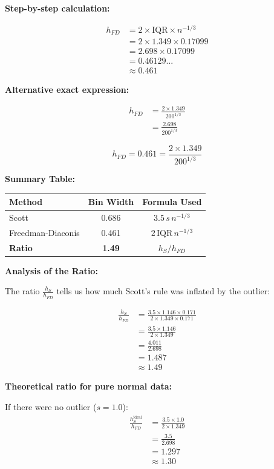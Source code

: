 \documentclass[12pt]{article}
\begin{document}
\begin{solution}
\textbf{Step-by-step calculation:}

\begin{align*}
h_{FD} &= 2 \times \mathrm{IQR} \times n^{-1/3} \\
&= 2 \times 1.349 \times 0.17099 \\
&= 2.698 \times 0.17099 \\
&= 0.46129... \\
&\approx 0.461
\end{align*}

\textbf{Alternative exact expression:}

\begin{align*}
h_{FD} &= \frac{2 \times 1.349}{200^{1/3}} \\
&= \frac{2.698}{200^{1/3}}
\end{align*}

\[
\boxed{h_{FD} = 0.461 = \frac{2 \times 1.349}{200^{1/3}}}
\]

\textbf{Summary Table:}

\begin{center}
\begin{tabular}{|l|c|c|}
\hline
\textbf{Method} & \textbf{Bin Width} & \textbf{Formula Used} \\
\hline
Scott & 0.686 & \(3.5\,s\,n^{-1/3}\) \\
Freedman-Diaconis & 0.461 & \(2\,\mathrm{IQR}\,n^{-1/3}\) \\
\hline
\textbf{Ratio} & \textbf{1.49} & \(h_S / h_{FD}\) \\
\hline
\end{tabular}
\end{center}

\textbf{Analysis of the Ratio:}

The ratio \(\frac{h_S}{h_{FD}}\) tells us how much Scott's rule was inflated by the outlier:

\begin{align*}
\frac{h_S}{h_{FD}} &= \frac{3.5 \times 1.146 \times 0.171}{2 \times 1.349 \times 0.171} \\
&= \frac{3.5 \times 1.146}{2 \times 1.349} \\
&= \frac{4.011}{2.698} \\
&= 1.487 \\
&\approx 1.49
\end{align*}

\textbf{Theoretical ratio for pure normal data:}

If there were no outlier (\(s = 1.0\)):
\begin{align*}
\frac{h_S^{\text{ideal}}}{h_{FD}} &= \frac{3.5 \times 1.0}{2 \times 1.349} \\
&= \frac{3.5}{2.698} \\
&= 1.297 \\
&\approx 1.30
\end{align*}


\end{solution}
\end{document}
